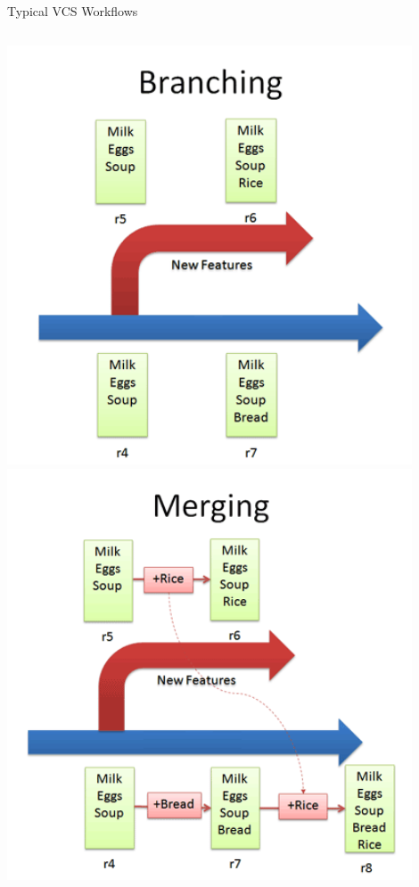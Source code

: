 \documentclass[10pt,xcolor=dvipsnames]{beamer}
\begin{document}
\begin{frame}{Typical VCS Workflows}
\begin{columns}
\centering
{\includegraphics [width=0.9\textwidth]{first_branch.png}}
\pause
{}
\centering
{\includegraphics [width=0.9\textwidth]{merging.png}}
\end{columns}
\end{frame}
\end{document}
